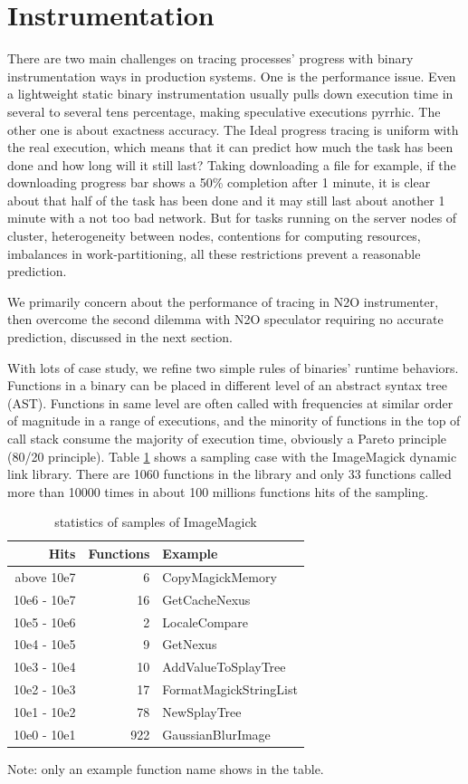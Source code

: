\section{Instrumentation}

There are two main challenges on tracing processes’ progress with binary instrumentation ways in production systems. One is the performance issue. Even a lightweight static binary instrumentation usually pulls down execution time in several to several tens percentage, making speculative executions pyrrhic.  The other one is about exactness accuracy. The Ideal progress tracing is uniform with the real execution, which means that it can predict how much the task has been done and how long will it still last? Taking downloading a file for example, if the downloading progress bar shows a 50\% completion after 1 minute, it is clear about that half of the task has been done and it may still last about another 1 minute with a not too bad network. But for tasks running on the server nodes of cluster, heterogeneity between nodes, contentions for computing resources, imbalances in work-partitioning, all these restrictions prevent a reasonable prediction.

We primarily concern about the performance of tracing in N2O instrumenter, then overcome the second dilemma with N2O speculator requiring no accurate prediction, discussed in the next section.

With lots of case study, we refine two simple rules of binaries’ runtime behaviors. Functions in a binary can be placed in different level of an abstract syntax tree (AST). Functions in same level are often called with frequencies at similar order of magnitude in a range of executions, and the minority of functions in the top of call stack consume the majority of execution time, obviously a Pareto principle (80/20 principle). Table \ref{table:inst-stats} shows a sampling case with the ImageMagick dynamic link library. There are 1060 functions in the library and only 33 functions called more than 10000 times in about 100 millions functions hits of the sampling.

 \begin{table}[h]
\caption{statistics of samples of ImageMagick}
\label{table:inst-stats}
\begin{center}
\begin{tabular}{r|r|l}
\hline
Hits & Functions & Example \\
\hline
above 10e7 & 6 & CopyMagickMemory \\
10e6 - 10e7 & 16 & GetCacheNexus \\
10e5 - 10e6 & 2 & LocaleCompare \\
10e4 - 10e5 & 9 & GetNexus \\
10e3 - 10e4 & 10 & AddValueToSplayTree \\
10e2 - 10e3 & 17 & FormatMagickStringList \\
10e1 - 10e2 & 78 & NewSplayTree \\
10e0 - 10e1 & 922 & GaussianBlurImage \\
\hline
\end{tabular}
\end{center}
Note: only an example function name shows in the table.
\end{table}

